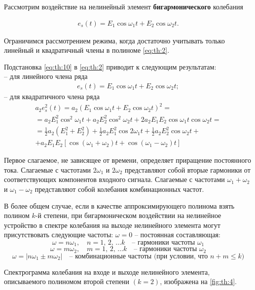 \documentclass[14pt]{extarticle}
\begin{document}
	Рассмотрим воздействие на нелинейный элемент \textbf{бигармонического} колебания
	
	\begin{align} \label{eq:th:10}
		e_s(t) = E_1 \cos \omega_1 t + E_2 \cos \omega_2 t.
	\end{align}
	
	Ограничимся рассмотрением режима, когда достаточно учитывать только линейный и квадратичный члены в полиноме \cref{eq:th:2}.
	
	Подстановка \cref{eq:th:10} в \cref{eq:th:2} приводит к следующим результатам:\\
	-- для линейного члена ряда
	\begin{align} \label{eq:th:11}
		e_s(t) = E_1 \cos \omega_1 t + E_2 \cos \omega_2 t;
	\end{align}
	-- для квадратичного члена ряда
	\begin{multline} \label{eq:th:12}
		a_2 e_s^2(t) = a_2 (E_1 \cos \omega_1 t + E_2 \cos \omega_2 t)^2 
		=\\=
		a_2 E_1^2 \cos^2 \omega_1 t + a_2 E_2^2 \cos^2 \omega_2 t + 2a_2 E_1 E_2 \cos \omega_1 t \cos \omega_2 t 
		=\\=
		\frac12 a_2 (E_1^2 + E_2^2) + \frac12 a_2 E_1^2 \cos 2\omega_1 t + \frac12 a_2 E_2^2 \cos \omega_2 t 
		+\\+
		a_2 E_1 E_2 [\cos (\omega_1 + \omega_2) t + \cos (\omega_1 - \omega_2)t]
	\end{multline}
	
	Первое слагаемое, не зависящее от времени, определяет приращение постоянного тока. Слагаемые с частотами $2\omega_1$ и $2\omega_2$ представляют собой вторые гармоники от соответствующих компонентов входного сигнала. Слагаемые с частотами $\omega_1 + \omega_2$ и $\omega_1 - \omega_2$ представляют собой колебания комбинационных частот. 
	
	В более общем случае, если в качестве аппроксимирующего полинома взять полином $k$-й степени, при бигармоническом воздействии на нелинейное устройство в спектре колебания на выходе нелинейного элемента могут присутствовать следующие частоты: $\omega = 0$ -- постоянная составляющая:
	\[
	\omega = n \omega_1, \quad n = 1,\,2,\,\dots k\quad \text{-- гармоники частоты $\omega_1$}
	\]  
	\[
	\omega = m \omega_2, \quad m = 1,\,2,\,\dots k\quad \text{-- гармоники частоты $\omega_2$}
	\]  
	\[
	\omega = |n\omega_1 \pm m\omega_2| \quad \text{-- комбинационные частоты (при условии, что $n+m \leqslant k$)}
	\]
	
	Спектрограмма колебания на входе и выходе нелинейного элемента, описываемого полиномом второй степени $(k = 2)$, изображена на \cref{fig:th:4}.
	
\end{document}
